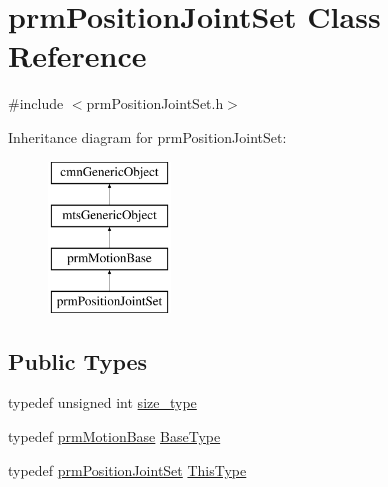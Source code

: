 \hypertarget{classprm_position_joint_set}{\section{prm\-Position\-Joint\-Set Class Reference}
\label{classprm_position_joint_set}
}


{\ttfamily \#include $<$prm\-Position\-Joint\-Set.\-h$>$}

Inheritance diagram for prm\-Position\-Joint\-Set\-:\begin{figure}[H]
\begin{center}
\leavevmode
\includegraphics[height=4.000000cm]{d0/df2/classprm_position_joint_set}
\end{center}
\end{figure}
\subsection*{Public Types}
\begin{DoxyCompactItemize}
\item 
typedef unsigned int \hyperlink{classprm_position_joint_set_a66e5a37bee0bb819b63270879d3ab08f}{size\-\_\-type}
\item 
typedef \hyperlink{classprm_motion_base}{prm\-Motion\-Base} \hyperlink{classprm_position_joint_set_a6e9b539600bf96ea6bad0516f577e7c2}{Base\-Type}
\item 
typedef \hyperlink{classprm_position_joint_set}{prm\-Position\-Joint\-Set} \hyperlink{classprm_position_joint_set_a8017067d40939015fc62a7b9e7fc70e1}{This\-Type}
\end{DoxyCompactItemize}
